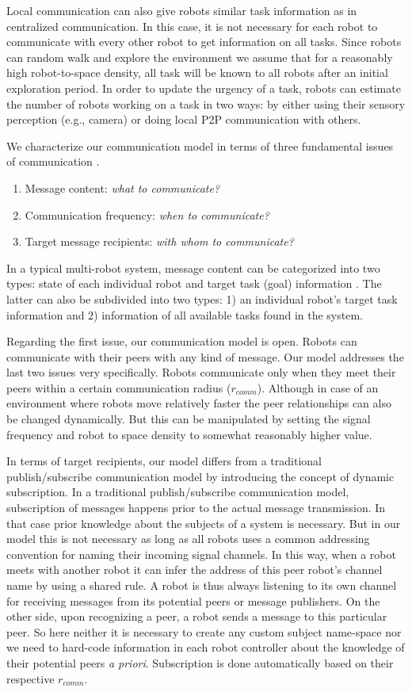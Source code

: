\documentclass[final,5p,times,twocolumn]{elsarticle}
\begin{document}
Local communication can also give robots similar task information as in centralized communication. In this case, it is not necessary for each robot to communicate with every other robot to get information on all tasks. Since robots can random walk and explore the environment we assume that for a reasonably high robot-to-space density, all task will be known to all robots after an initial exploration period. In order to update the urgency of a task, robots can estimate the number of robots working on a task in two ways:  by either using their sensory perception (e.g., camera) or  doing local P2P communication with others.

We characterize our communication model in terms of three fundamental issues of communication \cite{Gerkey+2001}. 
\begin{enumerate}
\item Message content: {\em what to communicate?}
\item Communication frequency: {\em when to communicate?}
\item Target message recipients: {\em with whom to communicate?}
\end{enumerate}
In a typical multi-robot system, message content can be categorized into two types: state of each individual robot and target task (goal) information \cite{Balch2005}. The latter can also be subdivided into two types: 1) an individual robot's target task information and 2) information of all available tasks found in the system.

Regarding the first issue, our communication model is open. Robots can communicate with their peers with any kind of message. Our model addresses the last two issues very specifically. Robots communicate only when they meet their peers within a certain communication radius ($r_{comm}$). Although in case of an environment where robots move relatively faster the peer relationships can also be changed dynamically. But this can be manipulated by setting the signal frequency and robot to space density to somewhat reasonably higher value.

In terms of target recipients, our model differs from a traditional publish/subscribe communication model by introducing the concept of dynamic subscription. In a traditional publish/subscribe communication model, subscription of messages happens prior to the actual message transmission. In that case prior knowledge about the subjects of a system is necessary. But in our model this is not necessary as long as all robots uses a common addressing convention for naming their incoming signal channels. In this way, when a robot meets with another robot it can infer the address of this peer robot's channel name by using a shared rule. A robot is thus always listening to its own channel for receiving messages from its potential peers or message publishers. On the other side, upon recognizing a peer, a robot sends a message to this particular peer. So here neither it is necessary to create any custom subject name-space  \cite{Gerkey+2001} nor we need to hard-code information in each robot controller about the knowledge of their potential peers {\em a priori}. Subscription is done automatically based on their respective $r_{comm}$.
%
\end{document}
